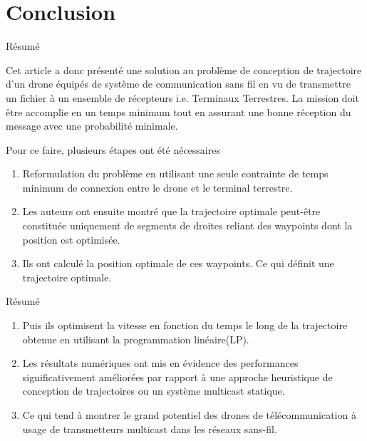 \section{Conclusion}


\begin{frame} {Résumé}

Cet article a donc présenté une solution au problème de conception
de trajectoire d'un drone équipés de système de communication sans fil
en vu de transmettre un fichier à un ensemble de récepteurs i.e. Terminaux Terrestres. 
La mission doit être accomplie en un temps minimum tout en assurant une bonne réception
du message avec une probabilité minimale.

\end{frame}


\begin{frame} {}

Pour ce faire, plusieurs étapes ont été nécessaires

\begin{enumerate}
	\item Reformulation du problème en utilisant une seule contrainte
	de temps minimum de connexion entre le drone et le terminal terrestre.\pause
	
	\item Les auteurs ont ensuite montré que la trajectoire optimale
	peut-être constituée uniquement de segments de droites reliant des
	waypoints dont la position est optimisée.\pause
	\item Ils ont calculé la position optimale de ces waypoints.
	Ce qui définit une trajectoire optimale. \pause 
	\asuivre
	
\end{enumerate}
\end{frame}	
	
\begin{frame} {Résumé}



\begin{enumerate}	
	
	 \suite
	\item Puis ils optimisent la vitesse en fonction du temps le long de la trajectoire obtenue
	en utilisant la programmation linéaire(LP).\pause
	\item Les résultats numériques ont mis en évidence des performances significativement améliorées
	 par rapport à une approche heuristique de conception de trajectoires ou un système multicast statique.\pause
	\item Ce qui tend à montrer le grand potentiel des drones de 
	télécommunication à usage de transmetteurs multicast dans les réseaux sans-fil.
	 
\end{enumerate}
\end{frame}



